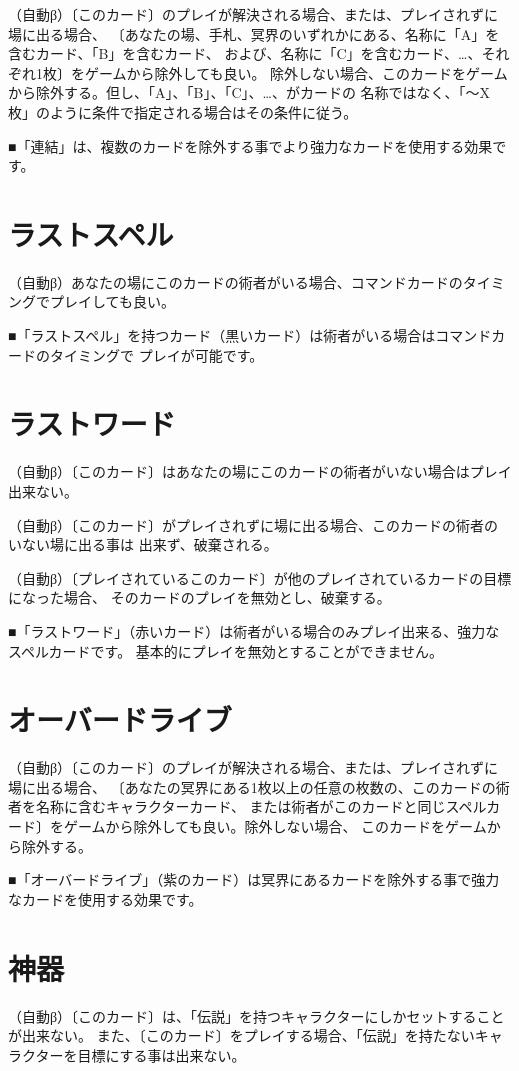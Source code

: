 \documentclass[fontsize=9pt,twocolumn,hanging_punctuation]{jlreq}
\newcommand{\↴}{{\fontspec{HackGen}↴}}
\begin{document}
（自動β）〔このカード〕のプレイが解決される場合、または、プレイされずに場に出る場合、
〔あなたの場、手札、冥界のいずれかにある、名称に「A」を含むカード、「B」を含むカード、
および、名称に「C」を含むカード、…、それぞれ1枚〕をゲームから除外しても良い。
除外しない場合、このカードをゲームから除外する。但し、「A」、「B」、「C」、…、がカードの
名称ではなく、「～X 枚」のように条件で指定される場合はその条件に従う。

■「連結」は、複数のカードを除外する事でより強力なカードを使用する効果です。

\section*{ラストスペル}
（自動β）あなたの場にこのカードの術者がいる場合、コマンドカードのタイミングでプレイしても良い。

■「ラストスペル」を持つカード（黒いカード）は術者がいる場合はコマンドカードのタイミングで
プレイが可能です。

\section*{ラストワード}
（自動β）〔このカード〕はあなたの場にこのカードの術者がいない場合はプレイ出来ない。

（自動β）〔このカード〕がプレイされずに場に出る場合、このカードの術者のいない場に出る事は
出来ず、破棄される。

（自動β）〔プレイされているこのカード〕が他のプレイされているカードの目標になった場合、
そのカードのプレイを無効とし、破棄する。

■「ラストワード」（赤いカード）は術者がいる場合のみプレイ出来る、強力なスペルカードです。
基本的にプレイを無効とすることができません。

\section*{オーバードライブ}
（自動β）〔このカード〕のプレイが解決される場合、または、プレイされずに場に出る場合、
〔あなたの冥界にある1枚以上の任意の枚数の、このカードの術者を名称に含むキャラクターカード、
または術者がこのカードと同じスペルカード〕をゲームから除外しても良い。除外しない場合、
このカードをゲームから除外する。

■「オーバードライブ」（紫のカード）は冥界にあるカードを除外する事で強力なカードを使用する効果です。

\pagebreak
\section*{神器}
（自動β）〔このカード〕は、「伝説」を持つキャラクターにしかセットすることが出来ない。
また、〔このカード〕をプレイする場合、「伝説」を持たないキャラクターを目標にする事は出来ない。
\end{document}
